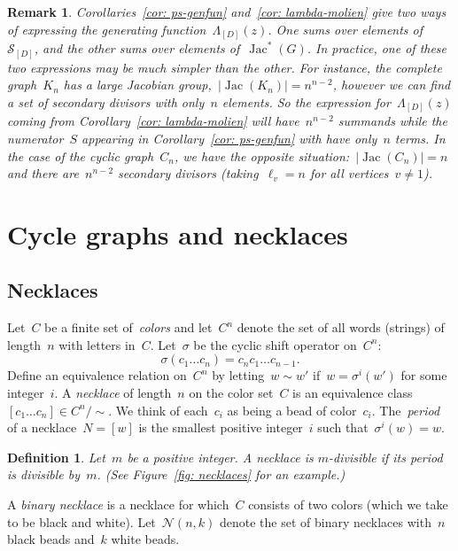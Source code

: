 \documentclass{amsart}
\newtheorem{Definition}[thm]{Definition}
\newenvironment{defn}
  {\begin{Definition}\rm}{\end{Definition}}
\newtheorem{Remark}[thm]{Remark}
\newenvironment{remark}
  {\begin{Remark}\rm}{\end{Remark}}
\DeclareMathOperator{\Jac}{Jac}
\newcommand{\secondary}{\mathcal{S}}
\newcommand{\tl}{\ell}
\newcommand{\neck}{\mathcal{N}}
\begin{document}
\begin{remark} Corollaries~\ref{cor: ps-genfun} and~\ref{cor: lambda-molien}
  give two ways of expressing the generating function~$\Lambda_{[D]}(z)$.  One
  sums over elements of~$\secondary_{[D]}$, and the other sums over elements
  of~$\Jac^*(G)$.  In practice, one of these two expressions may be much simpler
  than the other.  For instance, the complete graph~$K_n$ has a large Jacobian
  group,~$|\Jac(K_n)|=n^{n-2}$, however we can find a set of secondary divisors
  with only~$n$ elements.  So the expression for~$\Lambda_{[D]}(z)$ coming from
  Corollary~\ref{cor: lambda-molien} will have~$n^{n-2}$ summands while the
  numerator~$S$ appearing in Corollary~\ref{cor: ps-genfun} with have only~$n$
  terms.  In the case of the cyclic graph~$C_n$, we have the
  opposite situation:~$|\Jac(C_n)|=n$ and there are~$n^{n-2}$ secondary divisors
  (taking~$\tl_v=n$ for all vertices~$v\neq 1$).
\end{remark}


\section{Cycle graphs and necklaces}\label{sect: necklaces}

\subsection{Necklaces} Let~$C$ be a finite set of~{\em colors} and let~$C^n$
denote the set of all words (strings) of length~$n$ with letters in~$C$.
Let~$\sigma$ be the cyclic shift operator on~$C^n$:
\[
  \sigma(c_1\dots c_n) = c_n c_1\dots c_{n-1}.
\] 
Define an equivalence relation on~$C^n$ by letting~$w\sim w'$
if~$w=\sigma^i(w')$ for some integer~$i$.  A {\em necklace} of length~$n$ on the
color set~$C$ is an equivalence class $[c_1\dots c_n]\in C^n/\!\!\sim$.  We
think of each~$c_i$ as being a bead of color~$c_i$.  The~{\em period} of a
necklace~$N=[w]$ is the smallest positive integer~$i$ such that~$\sigma^i(w)=w$.

\begin{defn} Let~$m$ be a positive integer. A necklace is {\em
$m$-divisible} if its period is divisible by~$m$. (See Figure~\ref{fig:
necklaces} for an example.) 
\end{defn}

A {\em binary necklace} is a necklace for which~$C$ consists of two colors
(which we take to be black and white).  Let~$\neck(n,k)$ denote the set
of binary necklaces with~$n$ black beads and~$k$ white beads.  
\end{document}
